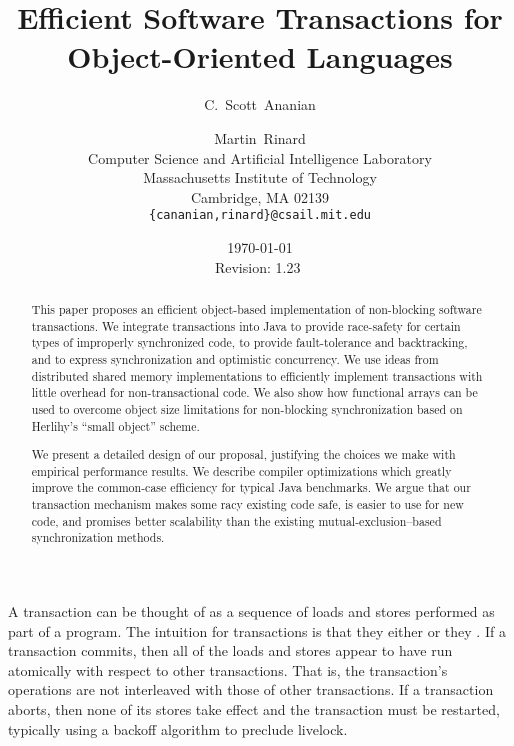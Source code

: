 \documentclass[preprint]{rdbacmconf}
\title{Efficient Software Transactions for Object-Oriented Languages}
\author{C.~Scott~Ananian \and Martin~Rinard \\
Computer Science and Artificial Intelligence Laboratory\\
Massachusetts Institute of Technology\\ 
Cambridge, MA 02139 \\
\texttt{\{cananian,rinard\}@csail.mit.edu}
}
\date{\today \\ $ $Revision: 1.23 $ $}
\begin{document}
%
\maketitle
{}
%
\begin{abstract}
This paper proposes an efficient object-based implementation of
non-blocking software transactions.  We integrate transactions into Java
to provide race-safety for certain types of improperly synchronized
code, to provide fault-tolerance and backtracking, and to express
synchronization and optimistic concurrency.  We use ideas from
distributed shared memory implementations to efficiently implement
transactions with little overhead for non-transactional code.  We also
show how functional arrays can be used to overcome object size
limitations for non-blocking synchronization based on Herlihy's
``small object'' scheme.

We present a detailed design of our proposal, justifying the choices
we make with empirical performance results.  We describe compiler
optimizations which greatly improve the common-case efficiency for
typical Java benchmarks.  We argue that our transaction mechanism
makes some racy existing code safe, is easier to use for new code,
and promises better scalability than the existing
mutual-exclusion--based synchronization methods.
\end{abstract}

%


A transaction can be thought of as a sequence of loads and stores
performed as part of a program.  The intuition for transactions is
that they either  or they .  If a transaction
commits, then all of the loads and stores appear to have run
atomically with respect to other transactions.  That is, the
transaction's operations are not interleaved with those of other
transactions.  If a transaction aborts, then none of its stores take
effect and the transaction must be restarted, typically using a
backoff algorithm to preclude livelock.
\end{document}
